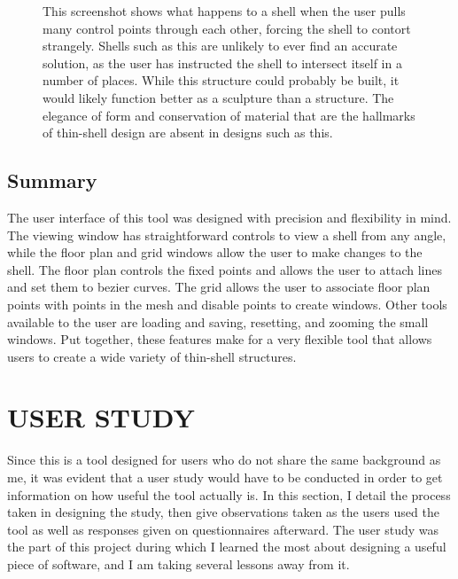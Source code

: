 \documentclass{thesis}
\begin{document}
\begin{figure}
\caption[A tangled mess]{This screenshot shows what happens to a shell when the user pulls many control points through each other,
forcing the shell to contort strangely.  Shells such as this are unlikely to ever find an accurate solution, as the user has
instructed the shell to intersect itself in a number of places.  While this structure could probably be built, it would likely function
better as a sculpture than a structure.  The elegance of form and conservation of material that are the hallmarks of thin-shell
design are absent in designs such as this.}
\label{fig:tangle1}
\end{figure}

\section{Summary}
The user interface of this tool was designed with precision and flexibility in mind.  The viewing window has straightforward controls
to view a shell from any angle, while the floor plan and grid windows allow the user to make changes to the shell.  The floor plan
controls the fixed points and allows the user to attach lines and set them to bezier curves.  The grid allows the user to associate
floor plan points with points in the mesh and disable points to create windows.  Other tools available to the user are loading and
saving, resetting, and zooming the small windows.  Put together, these features make for a very flexible tool that allows users to
create a wide variety of thin-shell structures.


\chapter{USER STUDY}
Since this is a tool designed for users who do not share the same background as me, it was evident that a user study would have to be
conducted in order to get information on how useful the tool actually is.  In this section, I detail the process taken in designing
the study, then give observations taken as the users used the tool as well as responses given on questionnaires afterward.  The user
study was the part of this project during which I learned the most about designing a useful piece of software, and I am taking several
lessons away from it.
\end{document}
